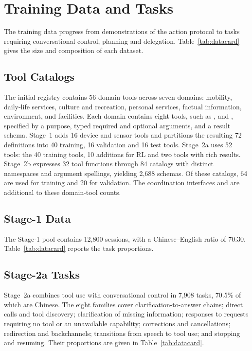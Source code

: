 \section{Training Data and Tasks}
\label{app:tasks}


The training data progress from demonstrations of the action protocol to tasks requiring conversational control, planning and delegation.
Table~\ref{tab:datacard} gives the size and composition of each dataset.

\subsection{Tool Catalogs}
The initial registry contains 56 domain tools across seven domains: mobility, daily-life services, culture and recreation, personal services, factual information, environment, and facilities.
Each domain contains eight tools, such as ,  and , specified by a purpose, typed required and optional arguments, and a result schema.
Stage~1 adds 16 device and sensor tools and partitions the resulting 72 definitions into 40 training, 16 validation and 16 test tools.
Stage~2a uses 52 tools: the 40 training tools, 10 additions for RL and two tools with rich results.
Stage~2b expresses 32 tool functions through 84 catalogs with distinct namespaces and argument spellings, yielding 2,688 schemas.
Of these catalogs, 64 are used for training and 20 for validation.
The coordination interfaces  and  are additional to these domain-tool counts.

\subsection{Stage-1 Data}
The Stage-1 pool contains 12,800 sessions, with a Chinese--English ratio of 70:30.
Table~\ref{tab:datacard} reports the task proportions.

\subsection{Stage-2a Tasks}
Stage~2a combines tool use with conversational control in 7,908 tasks, 70.5\% of which are Chinese.
The eight families cover clarification-to-answer chains; direct calls and tool discovery; clarification of missing information; responses to requests requiring no tool or an unavailable capability; corrections and cancellations; redirection and backchannels; transitions from speech to tool use; and stopping and resuming.
Their proportions are given in Table~\ref{tab:datacard}.


